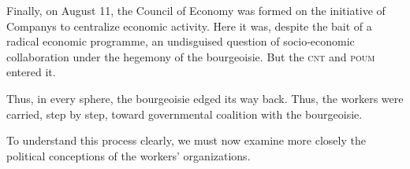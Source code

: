 Finally, on August 11, the Council of Economy was formed on the initiative of Companys to centralize economic activity. Here it was, despite the bait of a radical economic programme, an undisguised question of socio-economic collaboration under the hegemony of the bourgeoisie. But the \textsc{cnt} and \textsc{poum} entered it.

Thus, in every sphere, the bourgeoisie edged its way back. Thus, the workers were carried, step by step, toward governmental coalition with the bourgeoisie.

To understand this process clearly, we must now examine more closely the political conceptions of the workers’ organizations.